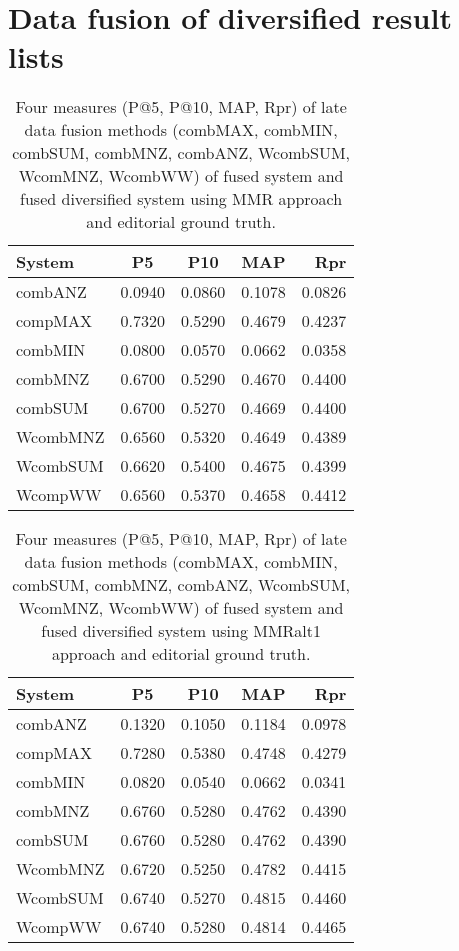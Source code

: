 \section{Data fusion of diversified result lists}

\begin{table}[H]
\begin{center}
\scriptsize
\caption{Four measures (P@5, P@10, MAP, Rpr) of late data fusion methods (combMAX, combMIN, combSUM, combMNZ, combANZ, WcombSUM, WcomMNZ, WcombWW) of fused system and fused diversified system using MMR approach and editorial ground truth.}
\label{table:LdfMmr}

\begin{tabular}{lcccr}
System & P\@5 & P\@10 & MAP & Rpr \\
\midrule
combANZ & 0.0940 & 0.0860 & 0.1078 & 0.0826 \\
compMAX & 0.7320 & 0.5290 & 0.4679 & 0.4237 \\
combMIN & 0.0800 & 0.0570 & 0.0662 & 0.0358 \\
combMNZ & 0.6700 & 0.5290 & 0.4670 & 0.4400 \\
combSUM & 0.6700 & 0.5270 & 0.4669 & 0.4400 \\
WcombMNZ & 0.6560 & 0.5320 & 0.4649 & 0.4389 \\
WcombSUM & 0.6620 & 0.5400 & 0.4675 & 0.4399 \\
WcompWW & 0.6560 & 0.5370 & 0.4658 & 0.4412 \\
\bottomrule
\end{tabular}
\end{center}
\end{table}

\begin{table}[H]
\begin{center}
\scriptsize
\caption{Four measures (P@5, P@10, MAP, Rpr) of late data fusion methods (combMAX, combMIN, combSUM, combMNZ, combANZ, WcombSUM, WcomMNZ, WcombWW) of fused system and fused diversified system using MMRalt1 approach and editorial ground truth.}
\label{table:LdfMmralt1}

\begin{tabular}{lcccr}

\midrule
System & P\@5 & P\@10 & MAP & Rpr \\
\midrule
combANZ & 0.1320 & 0.1050 & 0.1184 & 0.0978 \\
compMAX & 0.7280 & 0.5380 & 0.4748 & 0.4279 \\
combMIN & 0.0820 & 0.0540 & 0.0662 & 0.0341 \\
combMNZ & 0.6760 & 0.5280 & 0.4762 & 0.4390 \\
combSUM & 0.6760 & 0.5280 & 0.4762 & 0.4390 \\
WcombMNZ & 0.6720 & 0.5250 & 0.4782 & 0.4415 \\
WcombSUM & 0.6740 & 0.5270 & 0.4815 & 0.4460 \\
WcompWW & 0.6740 & 0.5280 & 0.4814 & 0.4465 \\
\bottomrule
\end{tabular}
\end{center}
\end{table}

